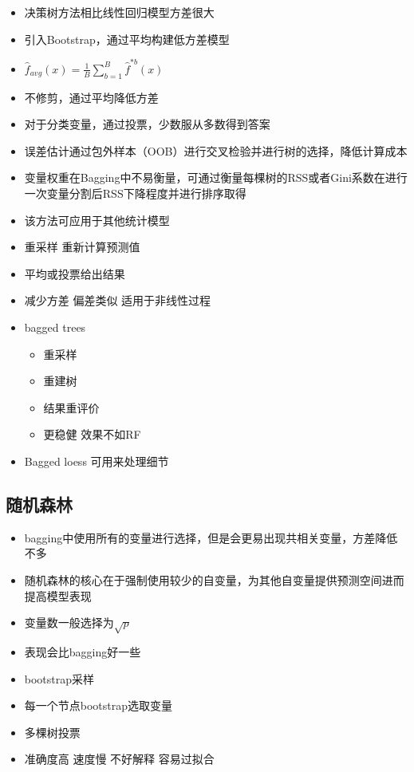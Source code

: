 \documentclass[
]{book}
\providecommand{\tightlist}{%
  \setlength{\itemsep}{0pt}\setlength{\parskip}{0pt}}
\begin{document}
\begin{itemize}
\item
  决策树方法相比线性回归模型方差很大
\item
  引入Bootstrap，通过平均构建低方差模型
\item
  \(\hat f_{avg}(x) = \frac{1}{B} \sum_{b = 1}^B \hat f^{*b}(x)\)
\item
  不修剪，通过平均降低方差
\item
  对于分类变量，通过投票，少数服从多数得到答案
\item
  误差估计通过包外样本（OOB）进行交叉检验并进行树的选择，降低计算成本
\item
  变量权重在Bagging中不易衡量，可通过衡量每棵树的RSS或者Gini系数在进行一次变量分割后RSS下降程度并进行排序取得
\item
  该方法可应用于其他统计模型
\item
  重采样 重新计算预测值
\item
  平均或投票给出结果
\item
  减少方差 偏差类似 适用于非线性过程
\item
  bagged trees

  \begin{itemize}
  \tightlist
  \item
    重采样
  \item
    重建树
  \item
    结果重评价
  \item
    更稳健 效果不如RF
  \end{itemize}
\item
  Bagged loess 可用来处理细节
\end{itemize}

\hypertarget{ux968fux673aux68eeux6797}{%
\subsection{随机森林}\label{ux968fux673aux68eeux6797}}

\begin{itemize}
\tightlist
\item
  bagging中使用所有的变量进行选择，但是会更易出现共相关变量，方差降低不多
\item
  随机森林的核心在于强制使用较少的自变量，为其他自变量提供预测空间进而提高模型表现
\item
  变量数一般选择为\(\sqrt p\)
\item
  表现会比bagging好一些
\item
  bootstrap采样
\item
  每一个节点bootstrap选取变量
\item
  多棵树投票
\item
  准确度高 速度慢 不好解释 容易过拟合
\end{itemize}
\end{document}
